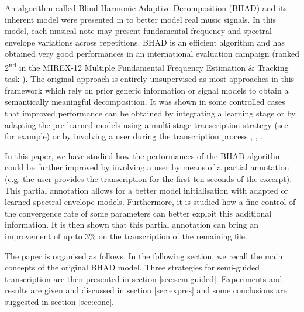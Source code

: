 \documentclass{article}
\begin{document}
\vspace{0.1cm}

An algorithm called Blind Harmonic Adaptive Decomposition (BHAD) and its inherent model were presented in \cite{Fuentes2012_EUSIPCO, Fuentes2013_PhD} to better model real music signals. In this model, each musical note may present fundamental frequency and spectral envelope variations across repetitions. BHAD is an efficient algorithm and has obtained very good performances in an international evaluation campaign (ranked 2\textsuperscript{nd} in the MIREX-12 Multiple Fundamental Frequency Estimation \& Tracking task \cite{MIREX2012}). 
The original approach is entirely unsupervised as most approaches in this framework which rely on prior generic information or signal models to obtain a semantically meaningful decomposition. It was shown in some controlled cases that improved performance can be obtained by integrating a learning stage or by adapting the pre-learned models using a multi-stage transcription strategy (see \cite{BenetosISMIR2014} for example) or by involving a user during the transcription process \cite{Kirchhoff13}, \cite{ozerov2012general}, \cite{BryanEtAl_2013_SourSepaOfPoly}.

\vspace{0.1cm}

In this paper, we have studied how the performances of the BHAD algorithm could be further improved by involving a user by means of a partial annotation (e.g. the user provides the transcription for the first ten seconds of the excerpt). This partial annotation allows for a better model initialisation with adapted or learned spectral envelope models. Furthermore, it is studied how a fine control of the convergence rate of some parameters can better exploit this additional information. It is then shown that this partial annotation can bring an improvement of up to 3\% on the transcription of the remaining file.  %

\vspace{0.1cm}
The paper is organised as follows. In the following section, we recall the main concepts of the original BHAD model. Three strategies for semi-guided transcription are then presented in section \ref{sec:semiguided}. Experiments and results are given and discussed in section \ref{sec:expres} and some conclusions are suggested in section \ref{sec:conc}.  
\end{document}
